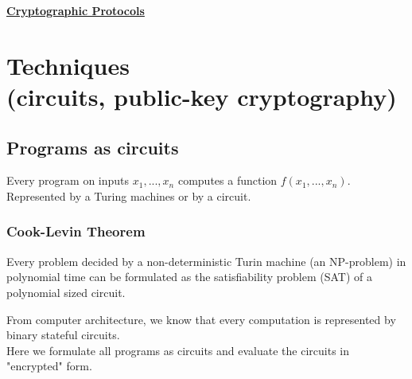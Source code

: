 \documentclass{report}
\begin{document}
\begin{center}
\huge{\textbf{\underline{Cryptographic Protocols}}}
\end{center}
 
{\let\clearpage\relax \chapter{Techniques \\ (circuits, public-key cryptography)}}

\section{Programs as circuits}
\begin{adjustwidth}{2em}{2em}
	Every program on inputs $x_1, ... , x_n$ computes a function $f(x_1, ..., x_n)$. Represented by a Turing machines or by a circuit.
	\subsection{Cook-Levin Theorem}
	\begin{adjustwidth}{2em}{}
		Every problem decided by a non-deterministic Turin machine (an NP-problem) in polynomial time can be formulated as the satisfiability problem (SAT) of a polynomial sized circuit. 
	\end{adjustwidth}
	From computer architecture, we know that every computation is represented by binary stateful circuits. \\
	Here we formulate all programs as circuits and evaluate the circuits in "encrypted" form.

\end{adjustwidth}
\end{document}
